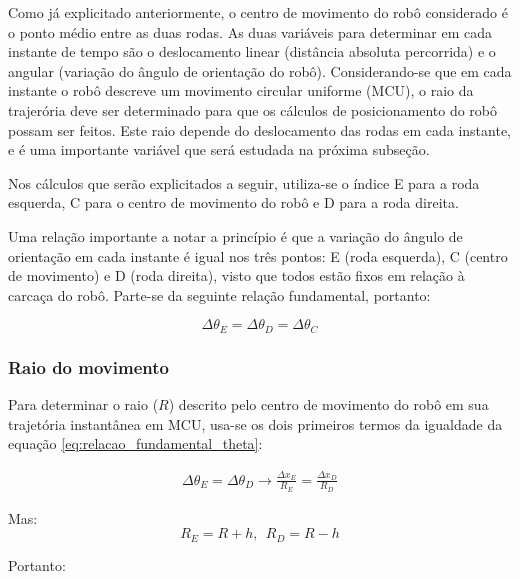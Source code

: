 Como já explicitado anteriormente, o centro de movimento do robô considerado é o ponto médio entre as duas rodas. As duas variáveis para determinar em cada instante de tempo são o deslocamento linear (distância absoluta percorrida) e o angular (variação do ângulo de orientação do robô). Considerando-se que em cada instante o robô descreve um movimento circular uniforme (MCU), o raio da trajerória deve ser determinado para que os cálculos de posicionamento do robô possam ser feitos. Este raio depende do deslocamento das rodas em cada instante, e é uma importante variável que será estudada na próxima subseção.

Nos cálculos que serão explicitados a seguir, utiliza-se o índice E para a roda esquerda, C para o centro de movimento do robô e D para a roda direita.

Uma relação importante a notar a princípio é que a variação do ângulo de orientação em cada instante é igual nos três pontos: E (roda esquerda), C (centro de movimento) e D (roda direita), visto que todos estão fixos em relação à carcaça do robô. Parte-se da seguinte relação fundamental, portanto:

\begin{equation}
  \Delta \theta_E = \Delta \theta_D = \Delta \theta_C
  \label{eq:relacao_fundamental_theta}
\end{equation}



\subsubsection{Raio do movimento}

Para determinar o raio ($R$) descrito pelo centro de movimento do robô em sua trajetória instantânea em MCU, usa-se os dois primeiros termos da igualdade da equação \ref{eq:relacao_fundamental_theta}:

\begin{eqnarray*}
  \Delta \theta_E = \Delta \theta_D \rightarrow \frac{\Delta x_E}{R_E} = \frac{\Delta x_D}{R_D} 
\end{eqnarray*}

Mas:
\begin{equation*}
  R_E = R + h, ~ ~ R_D = R - h
\end{equation*}

Portanto:

